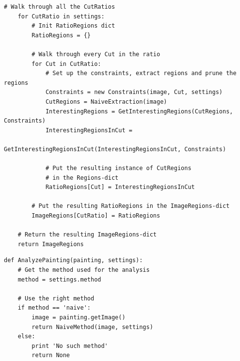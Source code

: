 {\begin{lstlisting}[caption={Pseudokode for den naive metode},
    captionpos=b, label={pseudo_naiveMethod}, frame=tb,
    breaklines=false, float=h]
    # Walk through all the CutRatios
    for CutRatio in settings:
        # Init RatioRegions dict
        RatioRegions = {}

        # Walk through every Cut in the ratio
        for Cut in CutRatio:
            # Set up the constraints, extract regions and prune the regions
            Constraints = new Constraints(image, Cut, settings)
            CutRegions = NaiveExtraction(image)
            InterestingRegions = GetInterestingRegions(CutRegions, Constraints)
            InterestingRegionsInCut =
                    GetInterestingRegionsInCut(InterestingRegionsInCut, Constraints)

            # Put the resulting instance of CutRegions
            # in the Regions-dict
            RatioRegions[Cut] = InterestingRegionsInCut

        # Put the resulting RatioRegions in the ImageRegions-dict
        ImageRegions[CutRatio] = RatioRegions

    # Return the resulting ImageRegions-dict
    return ImageRegions
\end{lstlisting}

\begin{lstlisting}[caption={Pseudokode til analyse af malerier efter
    metode}, captionpos=b, label={pseudo_naiveMethod}, frame=tb,
    breaklines=false, float=h]
def AnalyzePainting(painting, settings):
    # Get the method used for the analysis
    method = settings.method

    # Use the right method
    if method == 'naive':
        image = painting.getImage()
        return NaiveMethod(image, settings)
    else:
        print 'No such method'
        return None
\end{lstlisting}

}

